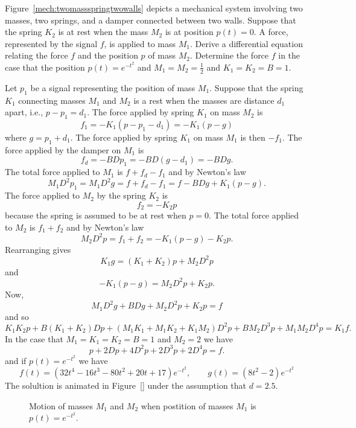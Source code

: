 \begin{excersizelist}
\begin{solution}
\end{solution}


\item \label{exer:twomassspringtwowalls} Figure~\ref{mech:twomassspringtwowalls} depicts a mechanical system involving two masses, two springs, and a damper connected between two walls.  Suppose that the spring $K_2$ is at rest when the mass $M_2$ is at position $p(t) = 0$.  A force, represented by the signal $f$, is applied to mass $M_1$.  Derive a differential equation relating the force $f$ and the position $p$ of mass $M_2$.  Determine the force $f$ in the case that the position $p(t) = e^{-t^2}$ and $M_1=M_2=\tfrac{1}{2}$ and $K_1 = K_2 = B = 1$.

\begin{solution}
Let $p_1$ be a signal representing the position of mass $M_1$.  Suppose that the spring $K_1$ connecting masses $M_1$ and $M_2$ is a rest when the masses are distance $d_1$ apart, i.e., $p - p_1 = d_1$.  The force applied by spring $K_1$ on mass $M_2$ is 
\[
f_1 = -K_1(p - p_1 - d_1) = -K_1(p - g)
\] 
where $g = p_1 + d_1$.  The force applied by spring $K_1$ on mass $M_1$ is then $-f_1$.  The force applied by the damper on $M_1$ is
\[
f_d = -BD p_1 = -BD(g - d_1) = - BD g.
\]
The total force applied to $M_1$ is $f + f_d - f_1$ and by Newton's law
\[
M_1 D^2 p_1 = M_1 D^2g = f + f_d - f_1 = f - BDg + K_1(p - g).
\]
The force applied to $M_2$ by the spring $K_2$ is
\[
f_2 = -K_2 p 
\] 
because the spring is assumed to be at rest when $p = 0$.  The total force applied to $M_2$ is $f_1 + f_2$ and by Newton's law
\[
M_2 D^2p = f_1 + f_2 =  -K_1(p - g) - K_2p.
\]
Rearranging gives
\[
K_1 g = (K_1+K_2)p + M_2 D^2p
\]
and
\[
-K_1(p - g) = M_2 D^2p  + K_2p .
\]
Now,
\[
M_1 D^2g + BDg + M_2 D^2p  + K_2p = f 
\]
and so
\[
K_1K_2 p + B(K_1+K_2)Dp + (M_1K_1 + M_1K_2 + K_1 M_2) D^2p  + BM_2D^3p + M_1M_2 D^4p = K_1 f .
\]
In the case that $M_1 = K_1 = K_2 = B = 1$ and $M_2 = 2$ we have
\[
p + 2Dp + 4D^2p + 2D^3p + 2D^4p = f.
\]
and if $p(t) = e^{-t^2}$ we have
\[
f(t) = (32 t^4-16 t^3-80 t^2+20 t+17) e^{-t^2}, \qquad g(t)=(8 t^2 - 2) e^{- t^2 }
\]
The solultion is animated in Figure~\ref{} under the assumption that $d = 2.5$.

\begin{figure}[tp]
  \centering
  \caption{Motion of masses $M_1$ and $M_2$ when postition of masses $M_1$ is $p(t) = e^{-t^2}$.} \label{fig:twomassestwowallsanimanim}
\end{figure}



\end{solution}
\end{excersizelist}
